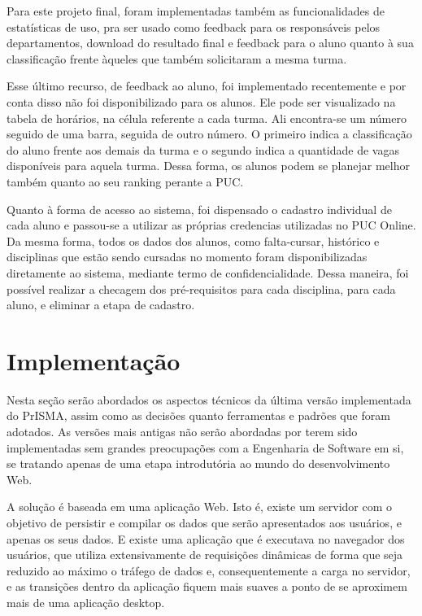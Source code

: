\documentclass[graduacao,brazil]{ThesisPUC}
\begin{document}
Para este projeto final, foram implementadas também as funcionalidades de estatísticas de uso, pra ser usado como feedback para os responsáveis pelos departamentos, download do resultado final e feedback para o aluno quanto à sua classificação frente àqueles que também solicitaram a mesma turma.

Esse último recurso, de feedback ao aluno, foi implementado recentemente e por conta disso não foi disponibilizado para os alunos. Ele pode ser visualizado na tabela de horários, na célula referente a cada turma. Ali encontra-se um número seguido de uma barra, seguida de outro número. O primeiro indica a classificação do aluno frente aos demais da turma e o segundo indica a quantidade de vagas disponíveis para aquela turma. Dessa forma, os alunos podem se planejar melhor também quanto ao seu ranking perante a PUC.

Quanto à forma de acesso ao sistema, foi dispensado o cadastro individual de cada aluno e passou-se a utilizar as próprias credencias utilizadas no PUC Online. Da mesma forma, todos os dados dos alunos, como falta-cursar, histórico e disciplinas que estão sendo cursadas no momento foram disponibilizadas diretamente ao sistema, mediante termo de confidencialidade. Dessa maneira, foi possível realizar a checagem dos pré-requisitos para cada disciplina, para cada aluno, e eliminar a etapa de cadastro.



\chapter{Implementação}

Nesta seção serão abordados os aspectos técnicos da última versão implementada do PrISMA, assim como as decisões quanto ferramentas e padrões que foram adotados. As versões mais antigas não serão abordadas por terem sido implementadas sem grandes preocupações com a Engenharia de Software em si, se tratando apenas de uma etapa introdutória ao mundo do desenvolvimento Web.

A solução é baseada em uma aplicação Web. Isto é, existe um servidor com o objetivo de persistir e compilar os dados que serão apresentados aos usuários, e apenas os seus dados. E existe uma aplicação que é executava no navegador dos usuários, que utiliza extensivamente de requisições dinâmicas de forma que seja reduzido ao máximo o tráfego de dados e, consequentemente a carga no servidor, e as transições dentro da aplicação fiquem mais suaves a ponto de se aproximem mais de uma aplicação desktop.
\end{document}
